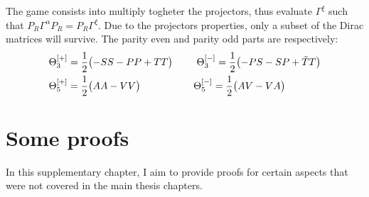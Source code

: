 \documentclass[english, LaM, oneside, noexaminfo]{sapthesis}
\newcommand{\colr}{\textcolor{red}}
\begin{document}
The game consists into multiply togheter the projectors, thus evaluate $\Gamma^\xi$ such that $ P_R \Gamma^\alpha P_R = P_R\Gamma^\xi $.
Due to the projectors properties, only a subset of the Dirac matrices will survive.
The parity even and parity odd parts are respectively:
\begin{equation*}
    \begin{aligned}
        & \Theta_3^{[+]} = \frac{1}{2}\bigl(-SS-PP+TT\bigr) & \hspace*{5mm}\Theta_3^{[-]} = \frac{1}{2}\bigl(-PS-SP+\tilde{T}T\bigr) \\
        & \Theta_5^{[+]} = \frac{1}{2}\bigl(AA-VV\bigr) &  \Theta_5^{[-]} = \frac{1}{2}\bigl(AV-VA\bigr) \hspace*{1.25cm}  \\
    \end{aligned}
\end{equation*}

\chapter{Some proofs}\label{app:proofs}
\noindent
In this supplementary chapter, I aim to provide proofs for certain aspects that were not covered in the main thesis chapters.

\end{document}
